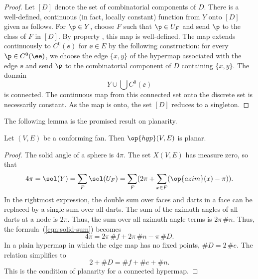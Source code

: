\begin{proof} Let $[D]$ denote the set of combinatorial components of
  $D$.  There is a well-defined, continuous (in fact, locally
  constant) function from $Y$ onto $[D]$ given as follows.  For $\p\in
  Y$, choose $F$ such that $\p\in U_F$ and send $\p$ to the class of
  $F$ in $[D]$.  By property , this map is
  well-defined.  The map extends continuously to $C^0(\ee)$ for
  $\ee\in E$ by the following construction: for every $\p\in
  C^0(\ee)$, we choose the edge $\{x,y\}$ of the hypermap associated
  with the edge $\ee$ and send $\p$ to the combinatorial component of
  $D$ containing $\{x,y\}$. The domain
\begin{displaymath}
Y\cup \bigcup C^0(\ee)
\end{displaymath}
is connected.  The continuous map from this connected set onto the
discrete set is necessarily constant.  As the map is onto, the set
$[D]$ reduces to a singleton.
\end{proof}

The following lemma is the promised result on planarity.

\begin{lemma}[]  
\label{lemma:cfplanar}
Let $(V,E)$ be a conforming fan.  
Then $\op{hyp}(V,E)$ is planar.
\end{lemma}
%
%

\begin{proof}  The solid angle of a sphere is $4\pi$.  The set $X(V,E)$
has measure zero, so that
\begin{equation}\label{eqn:solid-sum}
4\pi = \sol(Y)= \sum_F \sol(U_F) = 
\sum_F ( 2\pi + \sum_{x\in F} (\op{azim}(x)-\pi) ).
\end{equation}
In the rightmost expression, the double sum over faces and darts in a
face can be replaced by a single sum over all darts.  The sum of the
azimuth angles of all darts at a node is $2\pi$. Thus, the sum over all azimuth
angle terms is $2\pi\,\#n$.  Thus, the formula~(\ref{eqn:solid-sum})
becomes
\begin{displaymath}
4\pi = 2\pi\, \#f +2\pi\,\#n - \pi\, \#D.
\end{displaymath}
In a plain hypermap in which the edge map has no fixed points, $\#D =
2\,\#e$.  The relation  simplifies to
\begin{displaymath}
2 + \#D = \#f + \#e + \#n.
\end{displaymath}
This is the condition of planarity for a connected hypermap.
\end{proof}
%

